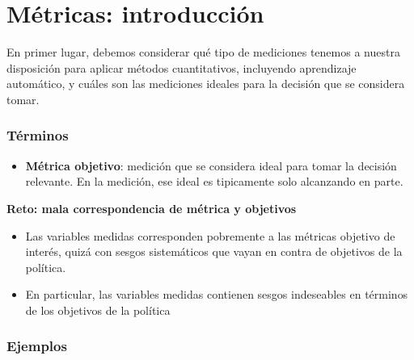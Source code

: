 \documentclass[
]{book}
\providecommand{\tightlist}{%
  \setlength{\itemsep}{0pt}\setlength{\parskip}{0pt}}
\let\BeginKnitrBlock\begin \let\EndKnitrBlock\end
\begin{document}
\hypertarget{muxe9tricas-introducciuxf3n}{%
\section{Métricas: introducción}\label{muxe9tricas-introducciuxf3n}}

En primer lugar, debemos considerar qué tipo de mediciones tenemos a nuestra
disposición para aplicar métodos cuantitativos, incluyendo aprendizaje automático, y cuáles
son las mediciones ideales para la decisión que se considera tomar.

\hypertarget{tuxe9rminos}{%
\subsubsection*{Términos}\label{tuxe9rminos}}


\begin{itemize}
\tightlist
\item
  \textbf{Métrica objetivo}: medición que se considera ideal para tomar la decisión relevante.
  En la medición, ese ideal es tipicamente solo alcanzando en parte.
\end{itemize}

\BeginKnitrBlock{rmdnote}
\textbf{Reto: mala correspondencia de métrica y objetivos}

\begin{itemize}
\item
  Las variables medidas corresponden pobremente a las métricas objetivo de interés, quizá con
  sesgos sistemáticos que vayan en contra de objetivos de la política.
\item
  En particular, las variables medidas contienen sesgos indeseables en términos de los objetivos de la política
\end{itemize}
\EndKnitrBlock{rmdnote}

\hypertarget{ejemplos}{%
\subsubsection*{Ejemplos}\label{ejemplos}}
\end{document}
